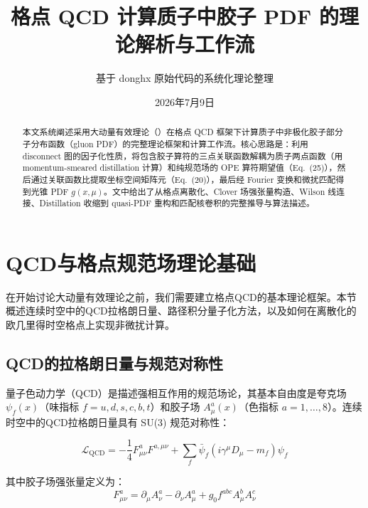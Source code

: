 \documentclass[11pt,a4paper]{ctexart}
\title{\textbf{格点 QCD 计算质子中胶子 PDF 的理论解析与工作流}}
\author{基于 donghx 原始代码的系统化理论整理}
\date{2026年7月9日}
\newcommand{\LaMET}{\text{LaMET}}
\begin{document}
\maketitle

\begin{abstract}
\noindent
本文系统阐述采用大动量有效理论（\LaMET）在格点 QCD 框架下计算质子中非极化胶子部分子分布函数（gluon PDF）的完整理论框架和计算工作流。核心思路是：利用 disconnect 图的因子化性质，将包含胶子算符的三点关联函数解耦为质子两点函数（用 momentum-smeared distillation 计算）和纯规范场的 OPE 算符期望值（Eq.~(25)），然后通过关联函数比提取坐标空间矩阵元（Eq.~(20)），最后经 Fourier 变换和微扰匹配得到光锥 PDF $g(x,\mu)$。文中给出了从格点离散化、Clover 场强张量构造、Wilson 线连接、Distillation 收缩到 quasi-PDF 重构和匹配核卷积的完整推导与算法描述。
\end{abstract}

\tableofcontents
\newpage

\section{QCD与格点规范场理论基础}

在开始讨论大动量有效理论之前，我们需要建立格点QCD的基本理论框架。本节概述连续时空中的QCD拉格朗日量、路径积分量子化方法，以及如何在离散化的欧几里得时空格点上实现非微扰计算。

\subsection{QCD的拉格朗日量与规范对称性}

量子色动力学（QCD）是描述强相互作用的规范场论，其基本自由度是夸克场 $\psi_f(x)$（味指标 $f = u, d, s, c, b, t$）和胶子场 $A_\mu^a(x)$（色指标 $a = 1,\ldots,8$）。连续时空中的QCD拉格朗日量具有 SU(3) 规范对称性：

\begin{equation}
\mathcal{L}_{\text{QCD}} = -\frac{1}{4} F_{\mu\nu}^a F^{a,\mu\nu} + \sum_f \bar{\psi}_f (i\gamma^\mu D_\mu - m_f) \psi_f
\end{equation}

其中胶子场强张量定义为：
\begin{equation}
F_{\mu\nu}^a = \partial_\mu A_\nu^a - \partial_\nu A_\mu^a + g_0 f^{abc} A_\mu^b A_\nu^c
\end{equation}
\end{document}
